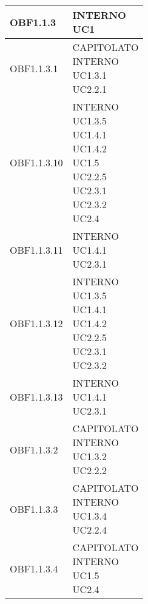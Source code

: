 \documentclass{scalatekids-article}
\begin{document}
\begin{longtable}[H]{|p{5.5cm}|p{5.5cm}|}
  \hline
  OBF1.1.3 & \multiLineCell[t]{INTERNO\\UC1\\}\\
  \hline
  OBF1.1.3.1 & \multiLineCell[t]{CAPITOLATO\\INTERNO\\UC1.3.1\\UC2.2.1\\}\\
  \hline
  OBF1.1.3.10 & \multiLineCell[t]{INTERNO\\UC1.3.5\\UC1.4.1\\UC1.4.2\\UC1.5\\UC2.2.5\\UC2.3.1\\UC2.3.2\\UC2.4\\}\\
  \hline
  OBF1.1.3.11 & \multiLineCell[t]{INTERNO\\UC1.4.1\\UC2.3.1\\}\\
  \hline
  OBF1.1.3.12 & \multiLineCell[t]{INTERNO\\UC1.3.5\\UC1.4.1\\UC1.4.2\\UC2.2.5\\UC2.3.1\\UC2.3.2\\}\\
  \hline
  OBF1.1.3.13 & \multiLineCell[t]{INTERNO\\UC1.4.1\\UC2.3.1\\}\\
  \hline
  OBF1.1.3.2 & \multiLineCell[t]{CAPITOLATO\\INTERNO\\UC1.3.2\\UC2.2.2\\}\\
  \hline
  OBF1.1.3.3 & \multiLineCell[t]{CAPITOLATO\\INTERNO\\UC1.3.4\\UC2.2.4\\}\\
  \hline
  OBF1.1.3.4 & \multiLineCell[t]{CAPITOLATO\\INTERNO\\UC1.5\\UC2.4\\}\\

\end{longtable}
\end{document}
